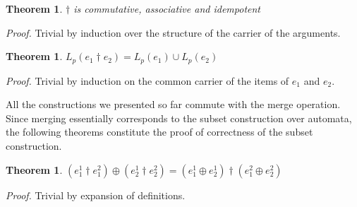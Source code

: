 \documentclass[preprint]{sigplanconf}
\newcounter{item}
\newtheorem{theorem}[item]{Theorem}
\newenvironment{proof}{\begin{trivlist}\item[]{\em Proof.}}{\end{trivlist}}
\begin{document}
\begin{theorem}$\dagger$ is commutative, associative and idempotent
\end{theorem}
\begin{proof}
Trivial by induction over the structure of the carrier of the arguments.
\end{proof}

\begin{theorem}
$L_p(e_1 \dagger e_2) = L_p(e_1) \cup L_p(e_2)$
\end{theorem}
\begin{proof}
Trivial by induction on the common carrier of the items of $e_1$ and $e_2$.
\end{proof}

All the constructions we presented so far commute with the merge operation.
Since merging essentially corresponds to the subset construction over automata,
the following theorems constitute the proof of correctness of the subset
construction.

\begin{theorem}
$(e^1_1 \dagger e^2_1) \oplus (e^1_2 \dagger e^2_2) =
  (e^1_1 \oplus e^1_2) \dagger (e^2_1 \oplus e^2_2)$
\end{theorem}
\begin{proof}
Trivial by expansion of definitions.
\end{proof}
\end{document}
